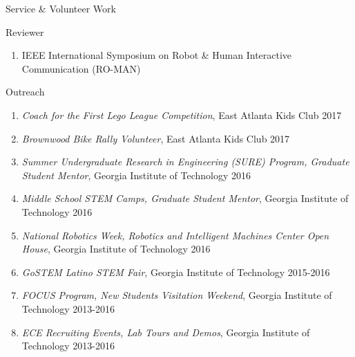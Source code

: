\documentclass{resume} %
\newcommand{\sectionspace}{\vspace{3mm}}
\newcommand{\simplelistentry}[3]{\textit{#1}, {#2} \hfill {#3}}
\begin{document}
\iffalse

\sectionspace

\begin{rSection}{Service \& Volunteer Work}

\begin{rSubsection}{Reviewer}{}{}{}
\item
\begin{enumerate}
\item IEEE International Symposium on Robot \& Human Interactive Communication (RO-MAN)
\end{enumerate}
\end{rSubsection}



\begin{rSubsection}{Outreach}{}{}{}
\item
\begin{enumerate}

\item \simplelistentry{Coach for the First Lego League Competition}{East Atlanta
    Kids Club}{2017}

\item \simplelistentry{Brownwood Bike Rally Volunteer}{East Atlanta Kids
    Club}{2017}

\item \simplelistentry{Summer Undergraduate Research in Engineering (SURE)
    Program, Graduate Student Mentor}{Georgia Institute of Technology}{2016}

\item \simplelistentry{Middle School STEM Camps, Graduate Student
    Mentor}{Georgia Institute of Technology}{2016}

\item \simplelistentry{National Robotics Week, Robotics and Intelligent Machines
    Center Open House}{Georgia Institute of Technology}{2016}

\item \simplelistentry{GoSTEM Latino STEM Fair}{Georgia Institute of
    Technology}{2015-2016}

\item \simplelistentry{FOCUS Program, New Students Visitation Weekend}{Georgia
    Institute of Technology}{2013-2016}

\item \simplelistentry{ECE Recruiting Events, Lab Tours and Demos}{Georgia
    Institute of Technology}{2013-2016}


\end{enumerate}
\end{rSubsection}
\end{rSection}
\end{document}
